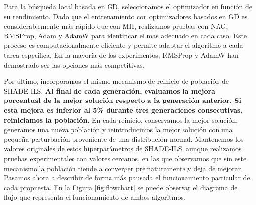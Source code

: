 Para la búsqueda local basada en GD, seleccionamos el optimizador en función de su rendimiento. Dado que el entrenamiento con optimizadores basados en GD es considerablemente más rápido que con MH, realizamos pruebas con NAG, RMSProp, Adam y AdamW para identificar el más adecuado en cada caso. Este proceso es computacionalmente eficiente y permite adaptar el algoritmo a cada tarea específica. En la mayoría de los experimentos, RMSProp y AdamW han demostrado ser las opciones más competitivas.



Por último, incorporamos el mismo mecanismo de reinicio de población de SHADE-ILS. \textbf{Al final de cada generación, evaluamos la mejora porcentual de la mejor solución respecto a la generación anterior. Si esta mejora es inferior al 5\% durante tres generaciones consecutivas, reiniciamos la población}. En cada reinicio, conservamos la mejor solución, generamos una nueva población y reintroducimos la mejor solución con una pequeña perturbación proveniente de una distribución normal. Mantenemos los valores originales de estos hiperparámetros de SHADE-ILS, aunque realizamos pruebas experimentales con valores cercanos, en las que observamos que sin este mecanismo la población tiende a converger prematuramente y deja de mejorar. Pasamos ahora a describir de forma más pausada el funcionamiento particular de cada propuesta. En la Figura \ref{fig:flowchart} se puede observar el diagrama de flujo que representa el funcionamiento de ambos algoritmos.

